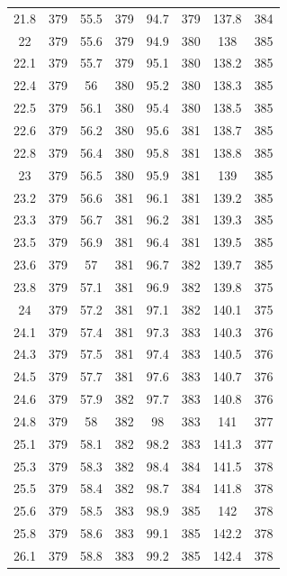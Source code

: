 \documentclass[12pt]{ctexart}
\numberwithin{equation}{section}
\begin{document}
\begin{longtable}{cc|cc|cc|cc}
21.8  &  379  &  55.5  &  379  &  94.7  &  379  &  137.8  &  384  \\
22  &  379  &  55.6  &  379  &  94.9  &  380  &  138  &  385  \\
22.1  &  379  &  55.7  &  379  &  95.1  &  380  &  138.2  &  385  \\
22.4  &  379  &  56  &  380  &  95.2  &  380  &  138.3  &  385  \\
22.5  &  379  &  56.1  &  380  &  95.4  &  380  &  138.5  &  385  \\
22.6  &  379  &  56.2  &  380  &  95.6  &  381  &  138.7  &  385  \\
22.8  &  379  &  56.4  &  380  &  95.8  &  381  &  138.8  &  385  \\
23  &  379  &  56.5  &  380  &  95.9  &  381  &  139  &  385  \\
23.2  &  379  &  56.6  &  381  &  96.1  &  381  &  139.2  &  385  \\
23.3  &  379  &  56.7  &  381  &  96.2  &  381  &  139.3  &  385  \\
23.5  &  379  &  56.9  &  381  &  96.4  &  381  &  139.5  &  385  \\
23.6  &  379  &  57  &  381  &  96.7  &  382  &  139.7  &  385  \\
23.8  &  379  &  57.1  &  381  &  96.9  &  382  &  139.8  &  375  \\
24  &  379  &  57.2  &  381  &  97.1  &  382  &  140.1  &  375  \\
24.1  &  379  &  57.4  &  381  &  97.3  &  383  &  140.3  &  376  \\
24.3  &  379  &  57.5  &  381  &  97.4  &  383  &  140.5  &  376  \\
24.5  &  379  &  57.7  &  381  &  97.6  &  383  &  140.7  &  376  \\
24.6  &  379  &  57.9  &  382  &  97.7  &  383  &  140.8  &  376  \\
24.8  &  379  &  58  &  382  &  98  &  383  &  141  &  377  \\
25.1  &  379  &  58.1  &  382  &  98.2  &  383  &  141.3  &  377  \\
25.3  &  379  &  58.3  &  382  &  98.4  &  384  &  141.5  &  378  \\
25.5  &  379  &  58.4  &  382  &  98.7  &  384  &  141.8  &  378  \\
25.6  &  379  &  58.5  &  383  &  98.9  &  385  &  142  &  378  \\
25.8  &  379  &  58.6  &  383  &  99.1  &  385  &  142.2  &  378  \\
26.1  &  379  &  58.8  &  383  &  99.2  &  385  &  142.4  &  378  \\

\end{longtable}
\end{document}
